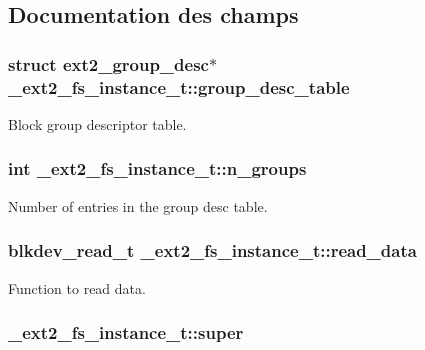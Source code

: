 \subsection{\-Documentation des champs}
\hypertarget{struct__ext2__fs__instance__t_acc01ef58cbc6cfa9d3ff4e08709a561a}{
\subsubsection[{group\-\_\-desc\-\_\-table}]{\setlength{\rightskip}{0pt plus 5cm}struct {\bf ext2\-\_\-group\-\_\-desc}$\ast$ {\bf \-\_\-ext2\-\_\-fs\-\_\-instance\-\_\-t\-::group\-\_\-desc\-\_\-table}}}\label{struct__ext2__fs__instance__t_acc01ef58cbc6cfa9d3ff4e08709a561a}
\-Block group descriptor table. \hypertarget{struct__ext2__fs__instance__t_a81a5e5b8f7d46d744c96a4f28317e59f}{
\subsubsection[{n\-\_\-groups}]{\setlength{\rightskip}{0pt plus 5cm}int {\bf \-\_\-ext2\-\_\-fs\-\_\-instance\-\_\-t\-::n\-\_\-groups}}}\label{struct__ext2__fs__instance__t_a81a5e5b8f7d46d744c96a4f28317e59f}
\-Number of entries in the group desc table. \hypertarget{struct__ext2__fs__instance__t_ac3ea85962b66914cb42ec884d70a853d}{
\subsubsection[{read\-\_\-data}]{\setlength{\rightskip}{0pt plus 5cm}blkdev\-\_\-read\-\_\-t {\bf \-\_\-ext2\-\_\-fs\-\_\-instance\-\_\-t\-::read\-\_\-data}}}\label{struct__ext2__fs__instance__t_ac3ea85962b66914cb42ec884d70a853d}
\-Function to read data. \hypertarget{struct__ext2__fs__instance__t_a456ee695fb1a0b71edadda9f4504ca2d}{
\subsubsection[{super}]{ {\bf \-\_\-ext2\-\_\-fs\-\_\-instance\-\_\-t\-::super}}}\label{struct__ext2__fs__instance__t_a456ee695fb1a0b71edadda9f4504ca2d}
